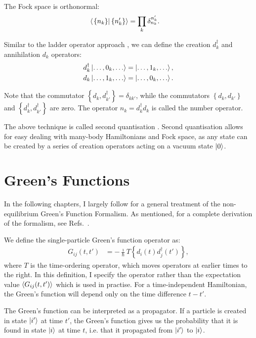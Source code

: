 The Fock space is orthonormal:
\begin{align*}
\braket{ \left. \left\{ n_k \right\} \right| \left\{ n_k' \right\}} &= \prod_{k} \delta_{n_k}^{n_k'}.
\end{align*}

Similar to the ladder operator approach \cite{griffiths}, we can define the creation $d^\dagger_k$ and annihilation $d_k$ operators:
\begin{align*}
d_k^\dagger \ket{\ldots, 0_k, \ldots} &=\ket{\ldots, 1_k, \ldots},\\
d_k \ket{\ldots, 1_k, \ldots} &=\ket{\ldots, 0_k, \ldots}.
\end{align*}

Note that the commutator $\left\{ d_k, d_{k'}^\dagger\right\} = \delta_{kk'}$, while the commutators $\left\{ d_k, d_{k'}\right\}$ and $\left\{ d_k^\dagger, d_{k'}^\dagger\right\}$ are zero. The operator $n_k = d_k^\dagger d_k$ is called the number operator. 

The above technique is called second quantisation \cite{yuli}. Second quantisation allows for easy dealing with many-body Hamiltonians and Fock space, as any state can be created by a series of creation operators acting on a vacuum state $\ket{0}$. 
 

\section{Green's Functions}
\label{sec:greensfunctions}
In the following chapters, I largely follow \citet{seldenthuis} for a general treatment of the non-equilibrium Green's Function Formalism. As mentioned, for a complete derivation of the formalism, see Refs.~\cite{mattuck,diventra,haugjauho}.

We define the single-particle Green's function operator as:
\begin{align}
G_{ij} (t,t') &= -\frac{\imath}{\hbar} T\left\{d_i(t)d_j^\dagger(t')\right\},
\label{eq:greensfunction}
\end{align}
where $T$ is the time-ordering operator, which moves operators at earlier times to the right. In this definition, I specify the operator rather than the expectation value $\braket{G_{ij}(t,t')}$ which is used in practise. For a time-independent Hamiltonian, the Green's function will depend only on the time difference $t - t'$. 

The Green's function can be interpreted as a propagator. If a particle is created in state $\ket{i'}$ at time $t'$, the Green's function gives us the probability that it is found in state $\ket{i}$ at time $t$, i.e. that it propagated from $\ket{i'}$ to $\ket{i}$.

